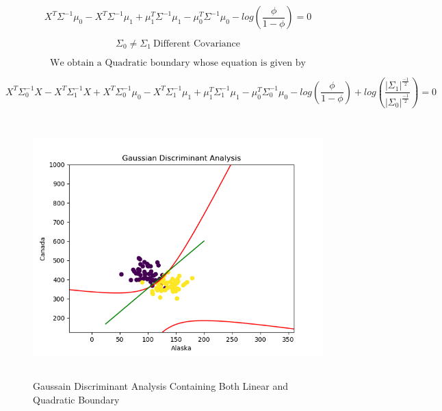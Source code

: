 \documentclass[10pt]{article}
\begin{document}
$$X^T\Sigma^{-1}\mu_0 - X^T\Sigma^{-1}\mu_1 + \mu_1^T\Sigma^{-1}\mu_1 - \mu_0^T\Sigma^{-1}\mu_0 - log(\frac{\phi}{1-\phi}) = 0$$



$$\Sigma_0 \neq \Sigma_1 \ \text{Different Covariance}$$

$$\text{We obtain a Quadratic boundary whose equation is given by}$$

$$X^T\Sigma_0^{-1}X -X^T\Sigma_1^{-1}X + X^T\Sigma_0^{-1}\mu_0 - X^T\Sigma_1^{-1}\mu_1 + \mu_1^T\Sigma_1^{-1}\mu_1 - \mu_0^T\Sigma_0^{-1}\mu_0 - log(\frac{\phi}{1-\phi}) + log(\frac{|\Sigma_1|^{\frac{-1}{2}}}{|\Sigma_0|^{\frac{-1}{2}}}) = 0$$

\begin{figure}[H]
	\includegraphics[width = 15cm,height = 10cm]{Q4_e}
	\caption{Gaussain Discriminant Analysis Containing Both Linear and Quadratic Boundary}
\end{figure}
\end{document}
